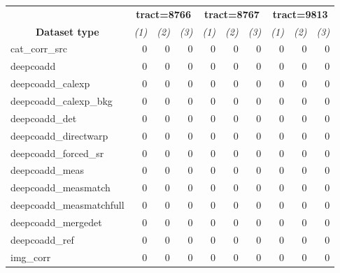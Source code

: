 \begin{table}
	\caption{
		Provenance verfication. Open Provenance Model (OPM) is used.  For each
		tract we verifiy: (1) missing direct association of file with the
		processing attempt, (2) missing OPM \emph{was generated by} association
		of the file with the pipeline code execution that produced it, and (3)
		if the given \emph{was generated by} id does not belong to the
		specified processing attempt.
	}
	\label{tab:provenance}
	\footnotesize
	\begin{longtable}{lrrrrrrrrr}
		\hline\hline
		                                          &
		\multicolumn{3}{c}{\textbf{tract=8766}}   &
		\multicolumn{3}{c}{\textbf{tract=8767}}   &
		\multicolumn{3}{c}{\textbf{tract=9813}}   \\
		\multicolumn{1}{c}{\textbf{Dataset type}} &
		\multicolumn{1}{c}{\textit{(1)}} &
		\multicolumn{1}{c}{\textit{(2)}} &
		\multicolumn{1}{c}{\textit{(3)}} &
		\multicolumn{1}{c}{\textit{(1)}} &
		\multicolumn{1}{c}{\textit{(2)}} &
		\multicolumn{1}{c}{\textit{(3)}} &
		\multicolumn{1}{c}{\textit{(1)}} &
		\multicolumn{1}{c}{\textit{(2)}} &
		\multicolumn{1}{c}{\textit{(3)}} \\
		\hline\hline
		cat\_corr\_src           & 0 & 0 & 0 & 0 & 0 & 0 & 0 & 0 & 0 \\
		deepcoadd                & 0 & 0 & 0 & 0 & 0 & 0 & 0 & 0 & 0 \\
		deepcoadd\_calexp        & 0 & 0 & 0 & 0 & 0 & 0 & 0 & 0 & 0 \\
		deepcoadd\_calexp\_bkg   & 0 & 0 & 0 & 0 & 0 & 0 & 0 & 0 & 0 \\
		deepcoadd\_det           & 0 & 0 & 0 & 0 & 0 & 0 & 0 & 0 & 0 \\
		deepcoadd\_directwarp    & 0 & 0 & 0 & 0 & 0 & 0 & 0 & 0 & 0 \\
		deepcoadd\_forced\_sr    & 0 & 0 & 0 & 0 & 0 & 0 & 0 & 0 & 0 \\
		deepcoadd\_meas          & 0 & 0 & 0 & 0 & 0 & 0 & 0 & 0 & 0 \\
		deepcoadd\_measmatch     & 0 & 0 & 0 & 0 & 0 & 0 & 0 & 0 & 0 \\
		deepcoadd\_measmatchfull & 0 & 0 & 0 & 0 & 0 & 0 & 0 & 0 & 0 \\
		deepcoadd\_mergedet      & 0 & 0 & 0 & 0 & 0 & 0 & 0 & 0 & 0 \\
		deepcoadd\_ref           & 0 & 0 & 0 & 0 & 0 & 0 & 0 & 0 & 0 \\
		img\_corr                & 0 & 0 & 0 & 0 & 0 & 0 & 0 & 0 & 0 \\

\end{longtable}
\end{table}
